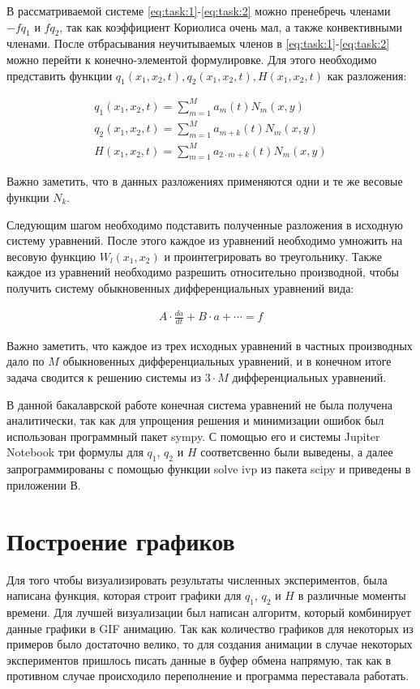 \documentclass[14pt]{extreport}
\begin{document}
В рассматриваемой системе \ref{eq:task:1}-\ref{eq:task:2} можно пренебречь членами $-fq_{1}$ и $fq_2$, так как коэффициент Кориолиса очень мал, а также конвективными членами. После отбрасывания неучитываемых членов в \ref{eq:task:1}-\ref{eq:task:2} можно перейти к конечно-элементой формулировке. Для этого необходимо представить функции $q_1(x_1, x_2,t) , q_2(x_1, x_2,t), H(x_1, x_2,t)$ как разложения:

\begin{eqnarray}\label{eq:fem:approx}
q_1(x_1, x_2, t) = \sum\limits_{m=1}^{M} a_m(t)N_m(x, y) \\
q_2(x_1, x_2, t) = \sum\limits_{m=1}^{M} a_{m+k}(t)N_m(x, y) \\
H(x_1, x_2, t) = \sum\limits_{m=1}^{M} a_{2\cdot m+k}(t)N_m(x, y)
\end{eqnarray}

Важно заметить, что в данных разложениях применяются одни и те же весовые функции $N_k$.

Следующим шагом необходимо подставить полученные разложения в исходную систему уравнений. После этого каждое из уравнений необходимо умножить на весовую функцию $W_l(x_1, x_2)$ и проинтегрировать во треугольнику. Также каждое из уравнений необходимо разрешить относительно производной, чтобы получить систему обыкновенных дифференциальных уравнений\cite{bib:calc:gurevich:2004} вида:

\begin{eqnarray}
A \cdot \frac{da}{dt} + B \cdot a + \cdots = f
\end{eqnarray}

Важно заметить, что каждое из трех исходных уравнений в частных производных дало по $M$ обыкновенных дифференциальных уравнений, и в конечном итоге задача сводится к решению системы из $3\cdot M$ дифференциальных уравнений.

В данной бакалаврской работе конечная система уравнений не была получена аналитически, так как для упрощения решения и минимизации ошибок был использован программный пакет sympy\cite{bib:python:mastering:2015}. С помощью его и системы Jupiter Notebook три формулы для $q_1$, $q_2$ и $H$ соответсвенно  были выведены, а далее запрограммированы с помощью функции solve ivp из пакета scipy и приведены в приложении В.

\section{Построение графиков}

Для того чтобы визуализировать результаты численных экспериментов, была написана функция, которая строит графики для $q_1$, $q_2$ и $H$ в различные моменты времени. Для лучшей визуализации был написан алгоритм, который комбинирует данные графики в GIF анимацию. Так как количество графиков для некоторых из примеров было достаточно велико, то для создания анимации в случае некоторых экспериментов пришлось писать данные в буфер обмена напрямую, так как в противном случае происходило переполнение и программа переставала работать.
\end{document}
